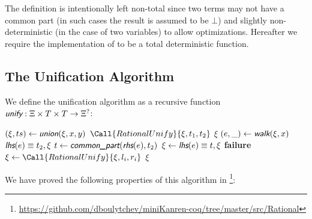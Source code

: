 The definition is intentionally left non-total since two terms may not have a common part (in such cases the result is assumed to be $\bot$) and slightly non-deterministic (in the case of two variables) to allow optimizations. Hereafter we require the implementation of \commonpart to be a total deterministic function.


\subsection{The Unification Algorithm}

We define the unification algorithm as a recursive function $\unify : \Xi \times T \times T \rightarrow \Xi^?$:

\begin{algorithmic}[1]
            \State $(\xi, ts) \gets \union(\xi, x, y)$
                \State \Return $\Call{RationalUnify}{\xi, t_1, t_2}$
            \EndIf
            \State \Return $\xi$
        \EndIf
            \State $(e, \_) \gets \walk(\xi, x)$
                \State \Return $\lhs(e) \equiv t_2, \xi$
            \EndIf
            \State $t \gets \commonpart(\rhs(e), t_2)$
            \EndIf
            \State $\xi \gets \lhs(e) \equiv t, \xi$
            \State \Return {}
        \EndIf
            \State \Return {}
        \EndIf
                \State \bf failure
            \EndIf
                \State $\xi \gets \Call{RationalUnify}{\xi, l_i, r_i}$
            \EndFor
            \State \Return $\xi$
        \EndIf
    \EndFunction
\end{algorithmic}

We have proved the following properties of this algorithm in \Rocq\footnote{\url{https://github.com/dboulytchev/miniKanren-coq/tree/master/src/Rational}}:

